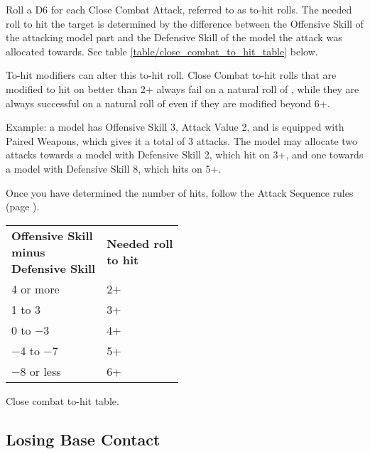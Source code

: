 Roll a D6 for each Close Combat Attack, referred to as to-hit rolls. The needed roll to hit the target is determined by the difference between the Offensive Skill of the attacking model part and the Defensive Skill of the model the attack was allocated towards. See table \ref{table/close_combat_to_hit_table} below.
\par
{}To-hit modifiers can alter this to-hit roll. Close Combat to-hit rolls that are modified to hit on better than 2+ always fail on a natural roll of , while they are always successful on a natural roll of  even if they are modified beyond 6+.
\par
Example: a model has Offensive Skill 3, Attack Value 2, and is equipped with Paired Weapons, which gives it a total of 3 attacks. The model may allocate two attacks towards a model with Defensive Skill 2, which hit on 3+, and one towards a model with Defensive Skill 8, which hits on 5+.

Once you have determined the number of hits, follow the Attack Sequence rules (page \pageref{attack_sequence}).

\begin{Figure}
	\Tanchor
	\centering
	\begin{tabular}{>{\raggedleft\let\newline\\\arraybackslash\hspace{0pt}}m{} m{}}
 	 \hline
 	 \textbf{Offensive Skill\newline minus\newline Defensive Skill} & \textbf{Needed roll\newline to hit}\tabularnewline
 	 4 or more & 2+ \tabularnewline
	  1 to 3 & 3+ \tabularnewline
	  0 to −3 & 4+\tabularnewline
 	 −4 to −7 & 5+\tabularnewline
 	 −8 or less & 6+\tabularnewline
 	 \hline
	\end{tabular}
	\caption{Close combat to-hit table.}
	\label{table/close_combat_to_hit_table}
\end{Figure}

\subsection{Losing Base Contact}
\label{losing_base_contact}

